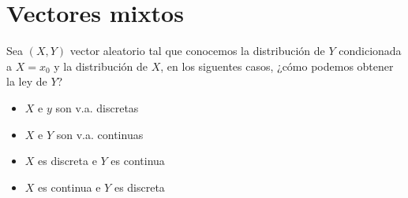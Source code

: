 \section{Vectores mixtos}


Sea $(X, Y)$ vector aleatorio tal que conocemos la distribución  de $Y$ condicionada a $X = x_0$ y la distribución de $X$, en los siguentes casos,
¿cómo podemos obtener la ley de $Y$?
\begin{itemize}
    \item $X$ e $y$ son v.a. discretas
    \item $X$ e $Y$ son v.a. continuas
    \item $X$ es discreta e $Y$ es continua
    \item $X$ es continua e $Y$ es discreta
\end{itemize}
